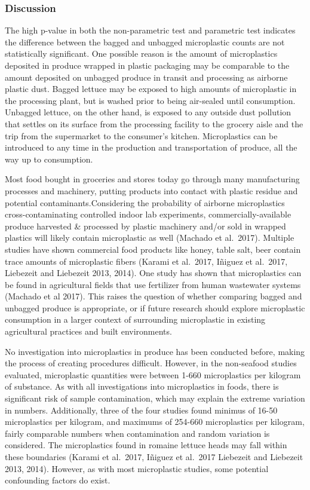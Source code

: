 \documentclass[]{article}
\begin{document}
\hypertarget{discussion}{%
\subsubsection{Discussion}\label{discussion}}

The high p-value in both the non-parametric test and parametric test
indicates the difference between the bagged and unbagged microplastic
counts are not statistically significant. One possible reason is the
amount of microplastics deposited in produce wrapped in plastic
packaging may be comparable to the amount deposited on unbagged produce
in transit and processing as airborne plastic dust. Bagged lettuce may
be exposed to high amounts of microplastic in the processing plant, but
is washed prior to being air-sealed until consumption. Unbagged lettuce,
on the other hand, is exposed to any outside dust pollution that settles
on its surface from the processing facility to the grocery aisle and the
trip from the supermarket to the consumer's kitchen. Microplastics can
be introduced to any time in the production and transportation of
produce, all the way up to consumption.

Most food bought in groceries and stores today go through many
manufacturing processes and machinery, putting products into contact
with plastic residue and potential contaminants.Considering the
probability of airborne microplastics cross-contaminating controlled
indoor lab experiments, commercially-available produce harvested \&
processed by plastic machinery and/or sold in wrapped plastics will
likely contain microplastic as well (Machado et al.~2017). Multiple
studies have shown commercial food products like honey, table salt, beer
contain trace amounts of microplastic fibers (Karami et al.~2017,
Iñiguez et al.~2017, Liebezeit and Liebezeit 2013, 2014). One study has
shown that microplastics can be found in agricultural fields that use
fertilizer from human wastewater systems (Machado et al 2017). This
raises the question of whether comparing bagged and unbagged produce is
appropriate, or if future research should explore microplastic
consumption in a larger context of surrounding microplastic in existing
agricultural practices and built environments.

No investigation into microplastics in produce has been conducted
before, making the process of creating procedures difficult. However, in
the non-seafood studies evaluated, microplastic quantities were between
1-660 microplastics per kilogram of substance. As with all
investigations into microplastics in foods, there is significant risk of
sample contamination, which may explain the extreme variation in
numbers. Additionally, three of the four studies found minimus of 16-50
microplastics per kilogram, and maximums of 254-660 microplastics per
kilogram, fairly comparable numbers when contamination and random
variation is considered. The microplastics found in romaine lettuce
heads may fall within these boundaries (Karami et al.~2017, Iñiguez et
al.~2017 Liebezeit and Liebezeit 2013, 2014). However, as with most
microplastic studies, some potential confounding factors do exist.
\end{document}
